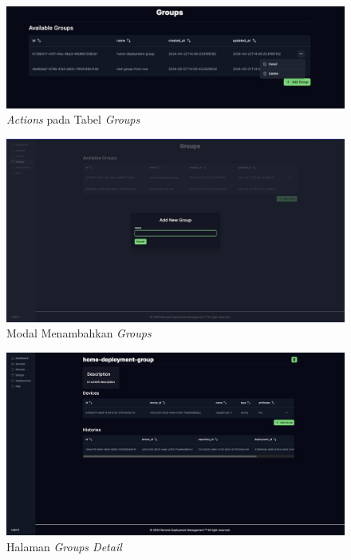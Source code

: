 \begin{figure}[ht]
  \centering
  \includegraphics[width=1\textwidth]{resources/chapter-4/dashboard/groups-page-actions.jpg}
  \caption{\textit{Actions} pada Tabel \textit{Groups}}
  \label{fig:halaman-groups-actions}
\end{figure}

\begin{figure}[ht]
  \centering
  \includegraphics[width=1\textwidth]{resources/chapter-4/dashboard/groups-page-add.jpg}
  \caption{Modal Menambahkan \textit{Groups}}
  \label{fig:halaman-groups-add}
\end{figure}

\begin{figure}[ht]
  \centering
  \includegraphics[width=1\textwidth]{resources/chapter-4/dashboard/groups-detail-page.jpg}
  \caption{Halaman \textit{Groups Detail}}
  \label{fig:halaman-groups-detail}
\end{figure}

